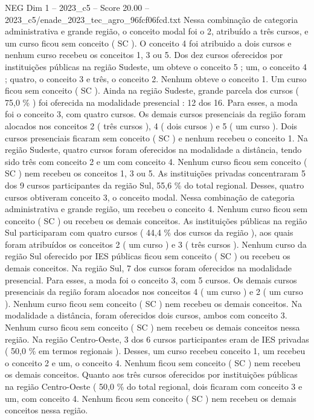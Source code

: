 \begin{textsample}{NEG Dim 1 – 2023\_c5 – Score 20.00 – 2023\_c5/enade\_2023\_tec\_agro\_96fcf06fcd.txt}
Nessa combinação de categoria administrativa e grande região, o conceito modal foi o 2, atribuído a três cursos, e um curso ficou sem conceito ( SC ).
O conceito 4 foi atribuido a dois cursos e nenhum curso recebeu os conceitos 1, 3 ou 5.
Dos dez cursos oferecidos por instituições públicas na região Sudeste, um obteve o conceito 5 ; um, o conceito 4 ; quatro, o conceito 3 e três, o conceito 2.
Nenhum obteve o conceito 1.
Um curso ficou sem conceito ( SC ).
Ainda na região Sudeste, grande parcela dos cursos ( 75,0 \% ) foi oferecida na modalidade presencial : 12 dos 16.
Para esses, a moda foi o conceito 3, com quatro cursos.
Os demais cursos presenciais da região foram alocados nos conceitos 2 ( três cursos ), 4 ( dois cursos ) e 5 ( um curso ).
Dois cursos presenciais ficaram sem conceito ( SC ) e nenhum recebeu o conceito 1.
Na região Sudeste, quatro cursos foram oferecidos na modalidade a distância, tendo sido três com conceito 2 e um com conceito 4.
Nenhum curso ficou sem conceito ( SC ) nem recebeu os conceitos 1, 3 ou 5.
As instituições privadas concentraram 5 dos 9 cursos participantes da região Sul, 55,6 \% do total regional.
Desses, quatro cursos obtiveram conceito 3, o conceito modal.
Nessa combinação de categoria administrativa e grande região, um recebeu o conceito 4.
Nenhum curso ficou sem conceito ( SC ) ou recebeu os demais conceitos.
As instituições públicas na região Sul participaram com quatro cursos ( 44,4 \% dos cursos da região ), aos quais foram atribuídos os conceitos 2 ( um curso ) e 3 ( três cursos ).
Nenhum curso da região Sul oferecido por IES públicas ficou sem conceito ( SC ) ou recebeu os demais conceitos.
Na região Sul, 7 dos cursos foram oferecidos na modalidade presencial.
Para esses, a moda foi o conceito 3, com 5 cursos.
Os demais cursos presenciais da região foram alocados nos conceitos 4 ( um curso ) e 2 ( um curso ).
Nenhum curso ficou sem conceito ( SC ) nem recebeu os demais conceitos.
Na modalidade a distância, foram oferecidos dois cursos, ambos com conceito 3.
Nenhum curso ficou sem conceito ( SC ) nem recebeu os demais conceitos nessa região.
Na região Centro-Oeste, 3 dos 6 cursos participantes eram de IES privadas ( 50,0 \% em termos regionais ).
Desses, um curso recebeu conceito 1, um recebeu o conceito 2 e um, o conceito 4.
Nenhum ficou sem conceito ( SC ) nem recebeu os demais conceitos.
Quanto aos três cursos oferecidos por instituições públicas na região Centro-Oeste ( 50,0 \% do total regional, dois ficaram com conceito 3 e um, com conceito 4.
Nenhum ficou sem conceito ( SC ) nem recebeu os demais conceitos nessa região.

\end{textsample}
